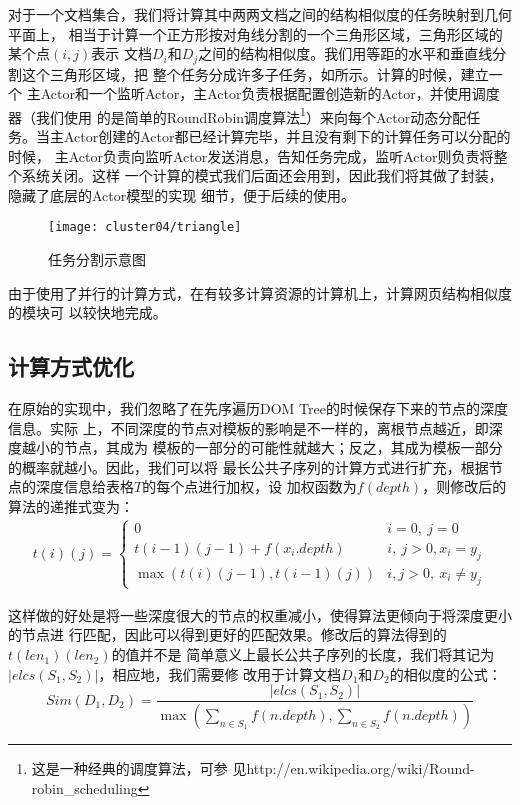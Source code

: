 对于一个文档集合，我们将计算其中两两文档之间的结构相似度的任务映射到几何平面上，
相当于计算一个正方形按对角线分割的一个三角形区域，三角形区域的某个点$(i, j)$表示
文档$D_i$和$D_j$之间的结构相似度。我们用等距的水平和垂直线分割这个三角形区域，把
整个任务分成许多子任务，如所示。计算的时候，建立一个
主Actor和一个监听Actor，主Actor负责根据配置创造新的Actor，并使用调度器（我们使用
的是简单的RoundRobin调度算法\footnote{这是一种经典的调度算法，可参
  见http://en.wikipedia.org/wiki/Round-robin\_scheduling}）来向每个Actor动态分配任
务。当主Actor创建的Actor都已经计算完毕，并且没有剩下的计算任务可以分配的时候，
主Actor负责向监听Actor发送消息，告知任务完成，监听Actor则负责将整个系统关闭。这样
一个计算的模式我们后面还会用到，因此我们将其做了封装，隐藏了底层的Actor模型的实现
细节，便于后续的使用。
\begin{figure}[h]
  \centering
  \texttt{[image: cluster04/triangle]}
  \caption{任务分割示意图}
  \label{cluster:fig:triangle}
\end{figure}

由于使用了并行的计算方式，在有较多计算资源的计算机上，计算网页结构相似度的模块可
以较快地完成。

\subsection{计算方式优化}
在原始的实现中，我们忽略了在先序遍历DOM Tree的时候保存下来的节点的深度信息。实际
上，不同深度的节点对模板的影响是不一样的，离根节点越近，即深度越小的节点，其成为
模板的一部分的可能性就越大；反之，其成为模板一部分的概率就越小。因此，我们可以将
最长公共子序列的计算方式进行扩充，根据节点的深度信息给表格$T$的每个点进行加权，设
加权函数为$f(depth)$，则修改后的算法的递推式变为：
\begin{eqnarray}
  t(i)(j) =
  \begin{cases}
    0 & i = 0,\: j = 0\\
    t(i-1)(j-1) + f(x_i.depth) & i,\: j > 0, x_i=y_j\\
    \max(t(i)(j-1), t(i-1)(j)) & i, j > 0,\: x_i \ne y_j
  \end{cases}
\end{eqnarray}

这样做的好处是将一些深度很大的节点的权重减小，使得算法更倾向于将深度更小的节点进
行匹配，因此可以得到更好的匹配效果。修改后的算法得到的$t(len_1)(len_2)$的值并不是
简单意义上最长公共子序列的长度，我们将其记为$|elcs(S_1,S_2)|$，相应地，我们需要修
改用于计算文档$D_1$和$D_2$的相似度的公式：
\[
Sim(D_1,D_2)=\frac{|elcs(S_1,S_2)|}{\max(\sum\limits_{n\in
    S_1}{f(n.depth)},\sum\limits_{n\in S_2}{f(n.depth)})}
\]
